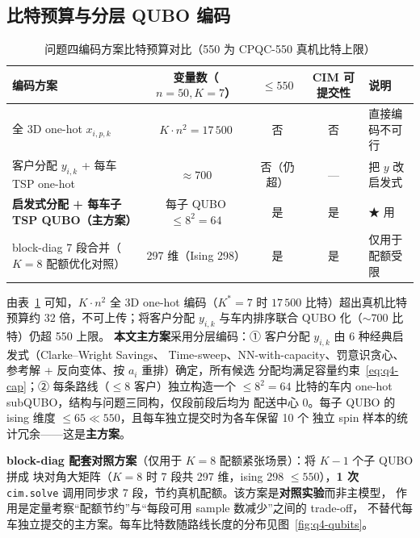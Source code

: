 \documentclass[UTF8,12pt,a4paper]{ctexart}
\begin{document}
\subsection{比特预算与分层 QUBO 编码}
\label{subsec:q4-budget}

\begin{table}[H]
    \centering
    \caption{问题四编码方案比特预算对比（550 为 CPQC-550 真机比特上限）}
    \label{tab:q4-budget}
    \footnotesize
    \begin{tabular}{lcccl}
        \toprule
        编码方案 & 变量数（$n=50,K=7$）& $\le 550$ & CIM 可提交性 & 说明 \\
        \midrule
        全 3D one-hot $x_{i,p,k}$                       & $K\!\cdot\!n^{2}=17\,500$ & 否 & 否          & 直接编码不可行 \\
        客户分配 $y_{i,k}$ + 每车 TSP one-hot           & $\approx 700$              & 否（仍超）& --- & 把 $y$ 改启发式 \\
        \textbf{启发式分配 + 每车子 TSP QUBO（主方案）} & 每子 QUBO $\le 8^{2}=64$    & 是 & 是          & ★ 用 \\
        block-diag 7 段合并（$K=8$ 配额优化对照）       & 297 维（Ising 298）        & 是 & 是          & 仅用于配额受限 \\
        \bottomrule
    \end{tabular}
\end{table}

由表~\ref{tab:q4-budget} 可知，$K\!\cdot\!n^{2}$ 全 3D one-hot 编码（$K^{*}\!=\!7$ 时
$17\,500$ 比特）超出真机比特预算约 32 倍，不可上传；将客户分配 $y_{i,k}$ 与车内排序联合
QUBO 化（$\sim 700$ 比特）仍超 550 上限。
\textbf{本文主方案}采用分层编码：① 客户分配 $y_{i,k}$ 由 6 种经典启发式（Clarke--Wright Savings\cite{clarke1964savings}、
Time-sweep、NN-with-capacity、罚意识贪心、参考解 + 反向变体、按 $a_i$ 重排）确定，所有候选
分配均满足容量约束~\eqref{eq:q4-cap}；② 每条路线（$\le 8$ 客户）独立构造一个
$\le 8^{2}=64$ 比特的车内 one-hot subQUBO，结构与问题三同构，仅段前段后均为
配送中心 $0$。每子 QUBO 的 ising 维度 $\le 65\ll 550$，且每车独立提交时为各车保留 10 个
独立 spin 样本的统计冗余——这是\textbf{主方案}。

\textbf{block-diag 配套对照方案}（仅用于 $K=8$ 配额紧张场景）：将 $K-1$ 个子 QUBO 拼成
块对角大矩阵（$K=8$ 时 7 段共 297 维，ising 298 $\le 550$），\textbf{1 次}
\texttt{cim.solve} 调用同步求 7 段，节约真机配额。该方案是\textbf{对照实验}而非主模型，
作用是定量考察``配额节约''与``每段可用 sample 数减少''之间的 trade-off，
不替代每车独立提交的主方案。每车比特数随路线长度的分布见图~\ref{fig:q4-qubits}。
\end{document}
